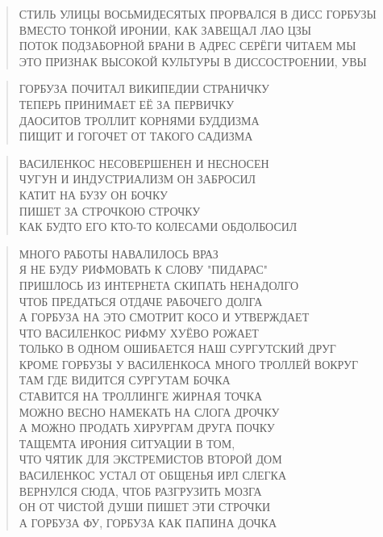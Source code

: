 \poemtitle{***}
\begin{verse}
СТИЛЬ УЛИЦЫ ВОСЬМИДЕСЯТЫХ ПРОРВАЛСЯ В ДИСС ГОРБУЗЫ\\
ВМЕСТО ТОНКОЙ ИРОНИИ, КАК ЗАВЕЩАЛ ЛАО ЦЗЫ\\
ПОТОК ПОДЗАБОРНОЙ БРАНИ В АДРЕС СЕРЁГИ ЧИТАЕМ МЫ\\
ЭТО ПРИЗНАК ВЫСОКОЙ КУЛЬТУРЫ В ДИССОСТРОЕНИИ, УВЫ
\end{verse}

\poemtitle{***}
\begin{verse}
ГОРБУЗА ПОЧИТАЛ ВИКИПЕДИИ СТРАНИЧКУ\\
ТЕПЕРЬ ПРИНИМАЕТ ЕЁ ЗА ПЕРВИЧКУ\\
ДАОСИТОВ ТРОЛЛИТ КОРНЯМИ БУДДИЗМА\\
ПИЩИТ И ГОГОЧЕТ ОТ ТАКОГО САДИЗМА
\end{verse}

\poemtitle{***}
\begin{verse}
ВАСИЛЕНКОС НЕСОВЕРШЕНЕН И НЕСНОСЕН\\
ЧУГУН И ИНДУСТРИАЛИЗМ ОН ЗАБРОСИЛ\\
КАТИТ НА БУЗУ ОН БОЧКУ\\
ПИШЕТ ЗА СТРОЧКОЮ СТРОЧКУ\\
КАК БУДТО ЕГО КТО-ТО КОЛЕСАМИ ОБДОЛБОСИЛ
\end{verse}

\poemtitle{***}
\begin{verse}
МНОГО РАБОТЫ НАВАЛИЛОСЬ ВРАЗ\\
Я НЕ БУДУ РИФМОВАТЬ К СЛОВУ "ПИДАРАС"\\
ПРИШЛОСЬ ИЗ ИНТЕРНЕТА СКИПАТЬ НЕНАДОЛГО\\
ЧТОБ ПРЕДАТЬСЯ ОТДАЧЕ РАБОЧЕГО ДОЛГА\\
А ГОРБУЗА НА ЭТО СМОТРИТ КОСО И УТВЕРЖДАЕТ\\
ЧТО ВАСИЛЕНКОС РИФМУ ХУЁВО РОЖАЕТ\\
ТОЛЬКО В ОДНОМ ОШИБАЕТСЯ НАШ СУРГУТСКИЙ ДРУГ\\
КРОМЕ ГОРБУЗЫ У ВАСИЛЕНКОСА МНОГО ТРОЛЛЕЙ ВОКРУГ\\
ТАМ ГДЕ ВИДИТСЯ СУРГУТАМ БОЧКА\\
СТАВИТСЯ НА ТРОЛЛИНГЕ ЖИРНАЯ ТОЧКА\\
МОЖНО ВЕСНО НАМЕКАТЬ НА СЛОГА ДРОЧКУ\\
А МОЖНО ПРОДАТЬ ХИРУРГАМ ДРУГА ПОЧКУ\\
ТАЩЕМТА ИРОНИЯ СИТУАЦИИ В ТОМ,\\
ЧТО ЧЯТИК ДЛЯ ЭКСТРЕМИСТОВ ВТОРОЙ ДОМ\\
ВАСИЛЕНКОС УСТАЛ ОТ ОБЩЕНЬЯ ИРЛ СЛЕГКА\\
ВЕРНУЛСЯ СЮДА, ЧТОБ РАЗГРУЗИТЬ МОЗГА\\
ОН ОТ ЧИСТОЙ ДУШИ ПИШЕТ ЭТИ СТРОЧКИ\\
А ГОРБУЗА ФУ, ГОРБУЗА КАК ПАПИНА ДОЧКА
\end{verse}

